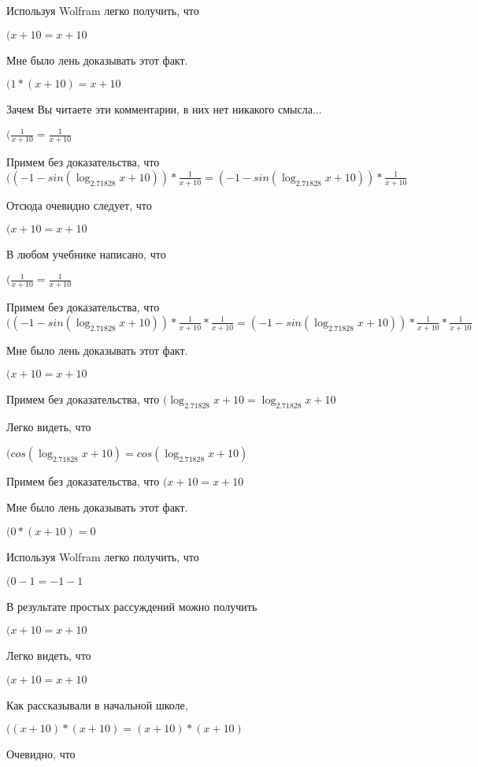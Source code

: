 \documentclass[12pt,a4paper,fleqn]{article}
\theoremstyle{definition}
\begin{document}
Используя Wolfram легко получить, что

$( x  +  10  =  x  +  10 $

Мне было лень доказывать этот факт.

$( 1  * ( x  +  10 ) =  x  +  10 $

Зачем Вы читаете эти комментарии, в них нет никакого смысла...

$(\frac{ 1 }{ x  +  10 }
 = \frac{ 1 }{ x  +  10 }
$

Примем без доказательства, что
$(( -1  - sin(\log_{ 2.71828 }{ x  +  10 })) * \frac{ 1 }{ x  +  10 }
 = ( -1  - sin(\log_{ 2.71828 }{ x  +  10 })) * \frac{ 1 }{ x  +  10 }
$

Отсюда очевидно следует, что

$( x  +  10  =  x  +  10 $

В любом учебнике написано, что

$(\frac{ 1 }{ x  +  10 }
 = \frac{ 1 }{ x  +  10 }
$

Примем без доказательства, что
$(( -1  - sin(\log_{ 2.71828 }{ x  +  10 })) * \frac{ 1 }{ x  +  10 }
 * \frac{ 1 }{ x  +  10 }
 = ( -1  - sin(\log_{ 2.71828 }{ x  +  10 })) * \frac{ 1 }{ x  +  10 }
 * \frac{ 1 }{ x  +  10 }
$

Мне было лень доказывать этот факт.

$( x  +  10  =  x  +  10 $

Примем без доказательства, что
$(\log_{ 2.71828 }{ x  +  10 } = \log_{ 2.71828 }{ x  +  10 }$

Легко видеть, что

$(cos(\log_{ 2.71828 }{ x  +  10 }) = cos(\log_{ 2.71828 }{ x  +  10 })$

Примем без доказательства, что
$( x  +  10  =  x  +  10 $

Мне было лень доказывать этот факт.

$( 0  * ( x  +  10 ) =  0 $

Используя Wolfram легко получить, что

$( 0  -  1  =  -1  -  1 $

В результате простых рассуждений можно получить

$( x  +  10  =  x  +  10 $

Легко видеть, что

$( x  +  10  =  x  +  10 $

Как рассказывали в начальной школе,

$(( x  +  10 ) * ( x  +  10 ) = ( x  +  10 ) * ( x  +  10 )$

Очевидно, что
\end{document}

